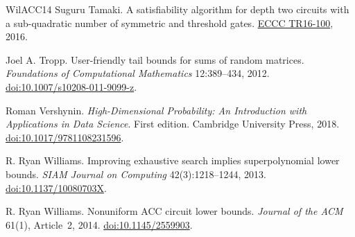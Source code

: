 \documentclass[11pt,letterpaper]{article}
\theoremstyle{definition}
\theoremstyle{remark}
\begin{document}
\begin{thebibliography}{WilACC14}
Suguru Tamaki. A satisfiability algorithm for depth two circuits
with a sub-quadratic number of symmetric and threshold gates.
\href{https://eccc.weizmann.ac.il/report/2016/100/}{ECCC TR16-100}, 2016.

Joel A. Tropp.
User-friendly tail bounds for sums of random matrices.
\emph{Foundations of Computational Mathematics} 12:389--434, 2012.
\href{https://doi.org/10.1007/s10208-011-9099-z}{doi:10.1007/s10208-011-9099-z}.

Roman Vershynin. \emph{High-Dimensional Probability:
An Introduction with Applications in Data Science}. First edition.
Cambridge University Press, 2018.
\href{https://doi.org/10.1017/9781108231596}{doi:10.1017/9781108231596}.

R. Ryan Williams. Improving exhaustive search implies superpolynomial
lower bounds. \emph{SIAM Journal on Computing} 42(3):1218--1244, 2013.
\href{https://doi.org/10.1137/10080703X}{doi:10.1137/10080703X}.

R. Ryan Williams. Nonuniform ACC circuit lower bounds.
\emph{Journal of the ACM} 61(1), Article~2, 2014.
\href{https://doi.org/10.1145/2559903}{doi:10.1145/2559903}.

\end{thebibliography}
\end{document}
